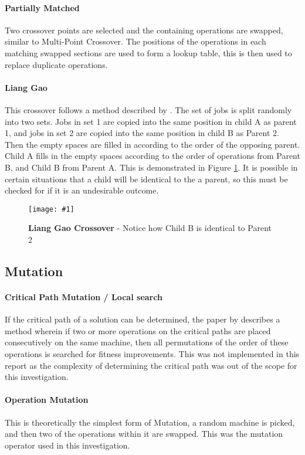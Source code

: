 \documentclass[14pt]{acmsiggraph}
\newcommand{\figuremacroW}[4]{
	\begin{figure}[h] %
		\centering
		\texttt{[image: \#1]}
		\caption[#2]{\textbf{#2} - #3}
		\label{fig:#1}
	\end{figure}
}
\begin{document}
\paragraph{Partially Matched }
Two crossover points are selected and the containing operations are swapped, similar to Multi-Point Crossover. The positions of the operations in each matching swapped sections are used to form a lookup table, this is then used to replace duplicate operations.  \cite{sivanandam2007introduction}

\paragraph{Liang Gao}
This crossover follows a method described by \cite{gao2011efficient}. The set of jobs is split randomly into two sets. Jobs in set 1 are copied into the same position in child A as parent 1, and jobs in set 2 are copied into the same position in child B as Parent 2. Then the empty spaces are filled in according to the order of the opposing parent. Child A fills in the empty spaces according to the order of operations from Parent B, and Child B from Parent A. This is demonstrated in Figure \ref{fig:cx}. It is possible in certain situations that a child will be identical to the a parent, so this must be checked for if it is an undesirable outcome.

\figuremacroW
{cx}
{Liang Gao Crossover}
{Notice how Child B is identical to Parent 2}
{1.0}

\subsection{Mutation}\label{mutmethods}
\paragraph {Critical Path Mutation / Local search}
If the critical path of a solution can be determined, the paper by \cite{gao2011efficient} describes a method wherein if two or more operations on the critical paths are placed consecutively on the same machine, then all permutations of the order of these operations is searched for fitness improvements. This was not implemented in this report as the complexity of determining the critical path was out of the scope for this investigation.

\paragraph{Operation Mutation}
This is theoretically the simplest form of Mutation, a random machine is picked, and then two of the operations within it are swapped. This was the mutation operator used in this investigation.
\end{document}
